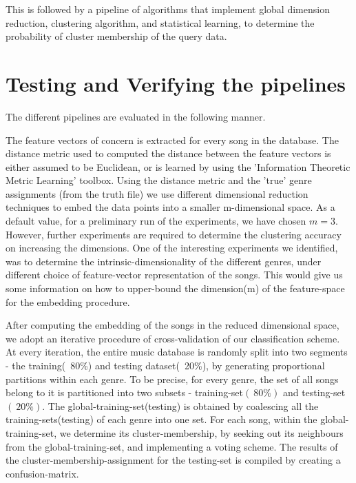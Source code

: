 \documentclass[12pt]{article}
\begin{document}
This is followed by a pipeline of algorithms that implement global dimension reduction, clustering algorithm, and statistical learning, to determine the probability of cluster membership of the query data. 

\section{Testing and Verifying the pipelines}

The different pipelines are evaluated in the following manner. 

The feature vectors of concern is extracted for every song in the database. The distance metric used to computed the distance between the feature vectors is either assumed to be Euclidean, or is learned by using the 'Information Theoretic Metric Learning' \cite{infoTheoryMetricLearning} toolbox. Using the distance metric and the 'true' genre assignments (from the truth file) we use different dimensional reduction techniques to embed the data points into a smaller m-dimensional space. As a default value, for a preliminary run of the experiments, we have chosen $m = 3$. However, further experiments are required to determine the clustering accuracy on increasing the dimensions. One of the interesting experiments we identified, was to determine the intrinsic-dimensionality of the different genres, under different choice of feature-vector representation of the songs. This would give us some information on how to upper-bound the dimension(m) of the feature-space for the embedding procedure.

After computing the embedding of the songs in the reduced dimensional space, we adopt an iterative procedure of cross-validation of our classification scheme. At every iteration, the entire music database is randomly split into two segments - the training(~80\%) and testing dataset(~20\%), by generating proportional partitions within each genre.
To be precise, for every genre, the set of all songs belong to it is partitioned into two subsets - training-set$(~80\%)$ and testing-set$(~20\%)$. The global-training-set(testing) is obtained by coalescing all the training-sets(testing) of each genre into one set. For each song, within the global-training-set, we determine its cluster-membership, by seeking out its neighbours from the global-training-set, and implementing a voting scheme. The results of the cluster-membership-assignment for the testing-set is compiled by creating a confusion-matrix. 
\end{document}
